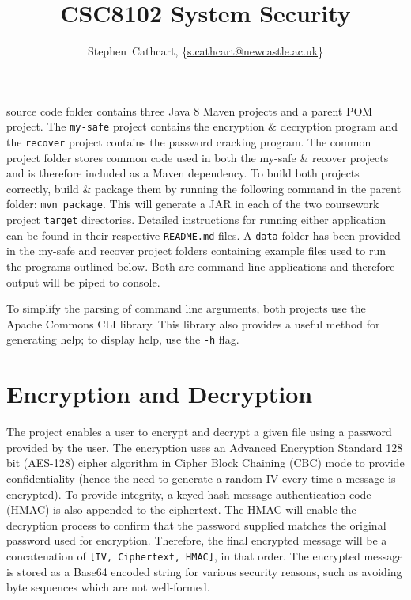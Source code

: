 \documentclass[journal,comsoc]{IEEEtran}
\begin{document}
	\title{CSC8102 System Security}
	
	\author{Stephen~Cathcart, \{\url{s.cathcart@newcastle.ac.uk}\}}%
	
	\maketitle

	\IEEEdisplaynontitleabstractindextext

	\IEEEpeerreviewmaketitle
	
	
	 source code folder contains three Java 8 Maven projects and a parent POM project. The \texttt{my-safe} project contains the encryption \& decryption program and the \texttt{recover} project contains the password cracking program. The common project folder stores common code used in both the my-safe \& recover projects and is therefore included as a Maven dependency. To build both projects correctly, build \& package them by running the following command in the parent folder: \texttt{mvn package}. This will generate a JAR in each of the two coursework project \texttt{target} directories. Detailed instructions for running either application can be found in their respective \texttt{README.md} files. A \texttt{data} folder has been provided in the my-safe and recover project folders containing example files used to run the programs outlined below. Both are command line applications and therefore output will be piped to console.
	
	To simplify the parsing of command line arguments, both projects use the Apache Commons CLI library. This library also provides a useful method for generating help; to display help, use the \texttt{-h} flag.
	
	\section{Encryption and Decryption}\label{sec:encryptionanddecryption}
	
	The project enables a user to encrypt and decrypt a given file using a password provided by the user. The encryption uses an Advanced Encryption Standard 128 bit (AES-128) cipher algorithm in Cipher Block Chaining (CBC) mode to provide confidentiality (hence the need to generate a random IV every time a message is encrypted). To provide integrity, a keyed-hash message authentication code (HMAC) is also appended to the ciphertext. The HMAC will enable the decryption process to confirm that the password supplied matches the original password used for encryption. Therefore, the final encrypted message will be a concatenation of \texttt{[IV, Ciphertext, HMAC]}, in that order. The encrypted message is stored as a Base64 encoded string for various security reasons, such as avoiding byte sequences which are not well-formed.
	
\end{document}
